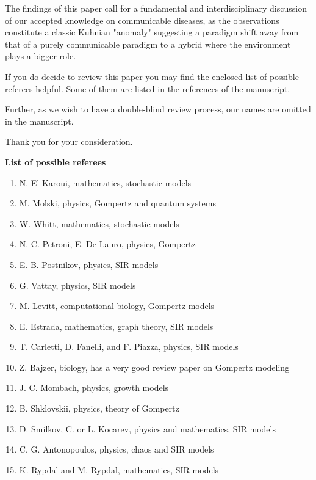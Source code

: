 \documentclass[11pt,a4paper,roman]{moderncv}
\begin{document}
The findings of this paper call for a fundamental and interdisciplinary discussion of our accepted knowledge on communicable diseases, as the observations constitute a classic Kuhnian "anomaly" suggesting a paradigm shift away from that of a purely communicable paradigm to a hybrid where the environment plays a bigger role.

If you do decide to review this paper you may find the enclosed list of possible referees helpful. 
Some of them are listed in the references of the manuscript. 

Further, as we wish to have a double-blind review process, our names are omitted in the manuscript.

Thank you for your consideration.

\makeletterclosing
\newpage
\textbf{List of possible referees}
\begin{enumerate}
\item N. El Karoui, mathematics, stochastic models
\item M. Molski, physics, Gompertz and quantum systems
\item W. Whitt, mathematics, stochastic models
\item N. C. Petroni, E. De Lauro, physics, Gompertz
\item E. B. Postnikov, physics, SIR models
\item G. Vattay, physics, SIR models
\item M. Levitt, computational biology, Gompertz models
\item E. Estrada, mathematics, graph theory, SIR models
\item T. Carletti, D. Fanelli, and F. Piazza, physics, SIR models
\item Z. Bajzer, biology, has a very good review paper on Gompertz modeling 
\item J. C. Mombach, physics, growth models
\item B. Shklovskii, physics, theory of Gompertz
\item D. Smilkov, C. or L. Kocarev, physics and mathematics, SIR models
\item C. G. Antonopoulos, physics, chaos and SIR models
\item K. Rypdal and M. Rypdal, mathematics, SIR models

\end{enumerate} 
\end{document}
